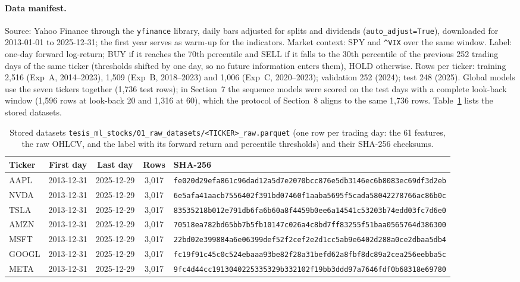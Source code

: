 \documentclass[10pt]{article}
\begin{document}
\paragraph{Data manifest.} Source: Yahoo Finance through the \texttt{yfinance} library, daily
bars adjusted for splits and dividends (\texttt{auto\_adjust=True}), downloaded for 2013-01-01 to
2025-12-31; the first year serves as warm-up for the indicators. Market context: SPY and \texttt{\textasciicircum VIX}
over the same window. Label: one-day forward log-return; BUY if it reaches the 70th percentile and
SELL if it falls to the 30th percentile of the previous 252 trading days of the same ticker
(thresholds shifted by one day, so no future information enters them), HOLD otherwise. Rows per
ticker: training 2,516 (Exp~A, 2014--2023), 1,509 (Exp~B, 2018--2023) and 1,006 (Exp~C,
2020--2023); validation 252 (2024); test 248 (2025). Global models use the seven tickers together
(1,736 test rows); in Section~7 the sequence models were scored on the test days with a complete
look-back window (1,596 rows at look-back 20 and 1,316 at 60), which the protocol of Section~8
aligns to the same 1,736 rows. Table~\ref{tab:s5} lists the stored datasets.

\begin{table}[H]\centering
\caption{Stored datasets \texttt{tesis\_ml\_stocks/01\_raw\_datasets/\textless TICKER\textgreater\_raw.parquet} (one row per trading day: the 61 features, the raw OHLCV, and the label with its forward return and percentile thresholds) and their SHA-256 checksums.}\label{tab:s5}
\begin{tabular}{@{}lcccl@{}}\toprule
Ticker & First day & Last day & Rows & SHA-256 \\ \midrule
AAPL & 2013-12-31 & 2025-12-29 & 3,017 & {\scriptsize\texttt{fe020d29efa861c96dad12a5d7e2070bcc876e5db3146ec6b8083ec69df3d2eb}} \\
NVDA & 2013-12-31 & 2025-12-29 & 3,017 & {\scriptsize\texttt{6e5afa41aacb7556402f391bd07460f1aaba5695f5cada58042278766ac86b0c}} \\
TSLA & 2013-12-31 & 2025-12-29 & 3,017 & {\scriptsize\texttt{83535218b012e791db6fa6b60a8f4459b0ee6a14541c53203b74edd03fc7d6e0}} \\
AMZN & 2013-12-31 & 2025-12-29 & 3,017 & {\scriptsize\texttt{70518ea782bd65bb7b5fb10147c026a4c8bd7ff83255f51baa0565764d386300}} \\
MSFT & 2013-12-31 & 2025-12-29 & 3,017 & {\scriptsize\texttt{22bd02e399884a6e06399def52f2cef2e2d1cc5ab9e6402d288a0ce2dbaa5db4}} \\
GOOGL & 2013-12-31 & 2025-12-29 & 3,017 & {\scriptsize\texttt{fc19f91c45c0c524ebaaa93be82f28a31befd62a8fbf8dc89a2cea256eebba5c}} \\
META & 2013-12-31 & 2025-12-29 & 3,017 & {\scriptsize\texttt{9fc4d44cc1913040225335329b332102f19bb3ddd97a7646fdf0b68318e69780}} \\
\bottomrule\end{tabular}\end{table}
\end{document}
